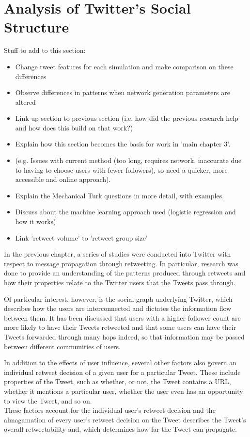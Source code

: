 \chapter{Analysis of Twitter's Social Structure}


Stuff to add to this section:
\begin{itemize}
\item Change tweet features for each simulation and make comparison on these differences
\item Observe differences in patterns when network generation parameters are altered
\item Link up section to previous section (i.e. how did the previous research help and how does this build on that work?)
\item Explain how this section becomes the basis for work in 'main chapter 3'.
\item (e.g. Issues with current method (too long, requires network, inaccurate due to having to choose users with fewer followers), so need a quicker, more accessible and online approach).
\item Explain the Mechanical Turk questions in more detail, with examples.
\item Discuss about the machine learning approach used (logistic regression and how it works)
\item Link 'retweet volume' to 'retweet group size'
\end{itemize}


In the previous chapter, a series of studies were conducted into Twitter with respect to message propagation through retweeting. In particular, research was done to provide an understanding of the patterns produced through retweets and how their properties relate to the Twitter users that the Tweets pass through.

Of particular interest, however, is the social graph underlying Twitter, which describes how the users are interconnected and dictates the information flow between them. It has been discussed that users with a higher follower count are more likely to have their Tweets retweeted and that some users can have their Tweets forwarded through many hops indeed, so that information may be passed between different communities of users.

In addition to the effects of user influence,  several other factors also govern an individual retweet decision of a given user for a particular Tweet. These include properties of the Tweet, such as whether, or not, the Tweet contains a URL, whether it mentions a particular user, whether the user even has an opportunity to view the Tweet, and so on.\\
These factors account for the individual user's retweet decision and the almagamation of every user's retweet decision on the Tweet describes the Tweet's overall retweetability and, which determines how far the Tweet can propagate.

